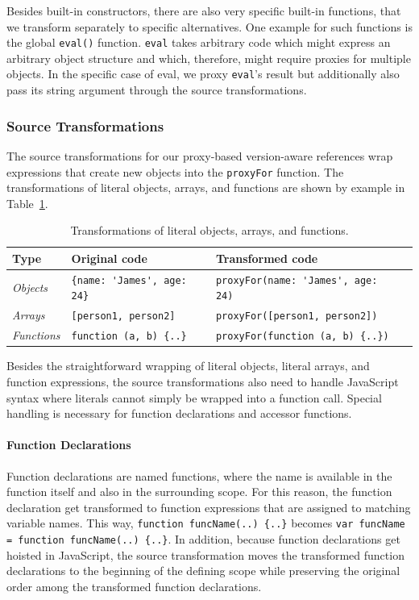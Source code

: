 Besides built-in constructors, there are also very specific built-in functions, that we transform separately to specific alternatives.
One example for such functions is the global \lstinline{eval()} function.
\lstinline{eval} takes arbitrary code which might express an arbitrary object structure and which, therefore, might require proxies for multiple objects.
In the specific case of eval, we proxy \lstinline{eval}'s result but additionally also pass its string argument through the source transformations.


\subsubsection{Source Transformations}

The source transformations for our proxy-based version-aware references wrap expressions that create new objects into the \lstinline{proxyFor} function.
The transformations of literal objects, arrays, and functions are shown by example in Table~\ref{table:literalTransforms}.

\begin{table}[h]
\begin{center}
\begin{tabular}{| l | l | l | l |}
\hline
Type & Original code & Transformed code \\ \hline
\emph{Objects} & \lstinline|{name: 'James', age: 24}| & \lstinline|proxyFor(name: 'James', age: 24)| \\ \hline
\emph{Arrays} & \lstinline|[person1, person2]| & \lstinline|proxyFor([person1, person2])| \\ \hline
\emph{Functions} & \lstinline|function (a, b) {..}| & \lstinline|proxyFor(function (a, b) {..})| \\ \hline
\end{tabular}
\end{center}
\caption[Table caption text]{Transformations of literal objects, arrays, and functions.}
\label{table:literalTransforms}
\end{table}


Besides the straightforward wrapping of literal objects, literal arrays, and function expressions, the source transformations also need to handle JavaScript syntax where literals cannot simply be wrapped into a function call.
Special handling is necessary for function declarations and accessor functions.

\paragraph{Function Declarations}
Function declarations are named functions, where the name is available in the function itself and also in the surrounding scope.
For this reason, the function declaration get transformed to function expressions that are assigned to matching variable names.
This way, \lstinline|function funcName(..) {..}| becomes \lstinline|var funcName = function funcName(..) {..}|.
In addition, because function declarations get hoisted in JavaScript, the source transformation moves the transformed function declarations to the beginning of the defining scope while preserving the original order among the transformed function declarations.

